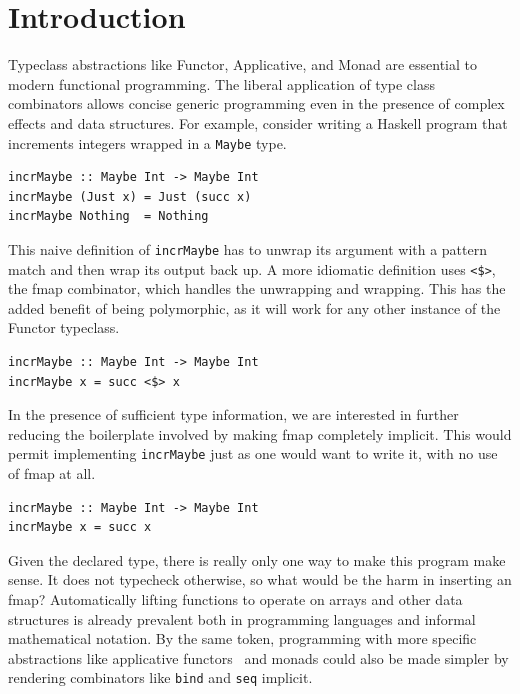 \documentclass[acmsmall,screen]{acmart}
\begin{document}


\theoremstyle{definition}
\newtheorem{specification}[section]{Specification}

\maketitle

\section{Introduction}
Typeclass abstractions like Functor, Applicative, and Monad are essential to
modern functional programming.
%
The liberal application of type class combinators allows
concise generic programming even in the presence of
complex effects and data structures.
%
For example, consider writing a Haskell program that increments integers wrapped
in a \verb|Maybe| type.
\begin{Verbatim}
incrMaybe :: Maybe Int -> Maybe Int
incrMaybe (Just x) = Just (succ x)
incrMaybe Nothing  = Nothing
\end{Verbatim}
This naive definition of \verb|incrMaybe| has to unwrap its argument with
a pattern match and then wrap its output back up.
A more idiomatic definition uses \verb|<$>|, the fmap combinator, which
handles the unwrapping and wrapping. This has the added benefit of being
polymorphic, as it will work for any other instance of the Functor typeclass.
\begin{Verbatim}
incrMaybe :: Maybe Int -> Maybe Int
incrMaybe x = succ <$> x
\end{Verbatim}
In the presence of sufficient type information, we are interested in further
reducing the boilerplate involved by making fmap completely implicit. This would
permit implementing \verb|incrMaybe| just as one would want to write it, with no
use of fmap at all.
\begin{Verbatim}
incrMaybe :: Maybe Int -> Maybe Int
incrMaybe x = succ x
\end{Verbatim}
Given the declared type, there is really only one way to make this program make
sense.  It does not typecheck otherwise, so what would be the harm in inserting
an fmap? Automatically lifting functions to operate on arrays and other data
structures is already prevalent both in programming languages and informal
mathematical notation. By the same token, programming with more specific
abstractions like applicative functors~\cite{mcbride2008applicative} and monads
could also be made simpler by rendering combinators like \texttt{bind} and
\texttt{seq} implicit.
\end{document}
